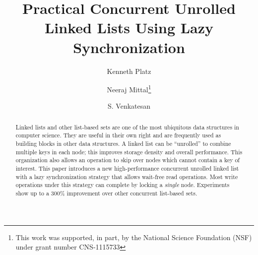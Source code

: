 \documentclass{llncs}
\begin{document}
\mainmatter  %

\title{Practical Concurrent Unrolled Linked Lists Using Lazy Synchronization}


%
%
\author{Kenneth Platz\and Neeraj Mittal\thanks{This work was supported, in part, by the National Science Foundation (NSF) under grant number CNS-1115733}\and S. Venkatesan}
%


%
%

\maketitle


\begin{abstract}
Linked lists and other list-based sets are one of the most ubiquitous
data structures in computer science.  They are useful in their
own right and are frequently used as building blocks in other
data structures.  A linked list can be ``unrolled'' to combine multiple
keys in each node; this improves storage density and overall performance.
This organization also allows an operation to skip over nodes which cannot 
contain a key of interest.
This paper introduces a new high-performance concurrent unrolled linked list
with  a lazy synchronization strategy that allows
wait-free read operations.  Most write operations under this strategy
can complete by locking a {\em single} node.  
Experiments show up to a 300\% improvement over other concurrent list-based sets.
\end{abstract}
\end{document}
